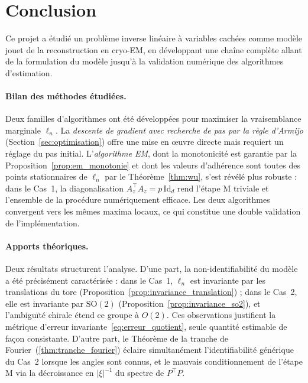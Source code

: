 \documentclass[12pt, a4paper]{article}
\theoremstyle{definition}
\newcommand{\Id}{\mathrm{Id}}
\begin{document}
% 
\newpage
\section*{Conclusion}

Ce projet a étudié un problème inverse linéaire à variables cachées comme modèle
jouet de la reconstruction en cryo-EM, en développant une chaîne complète allant
de la formulation du modèle jusqu'à la validation numérique des algorithmes
d'estimation.

\paragraph{Bilan des méthodes étudiées.}
Deux familles d'algorithmes ont été développées pour maximiser la vraisemblance
marginale $\ell_n$. La \emph{descente de gradient avec recherche de pas par la
règle d'Armijo} (Section~\ref{sec:optimisation}) offre une mise en œuvre directe
mais requiert un réglage du pas initial. L'\emph{algorithme EM}, dont la monotonicité
est garantie par la Proposition~\ref{prop:em_monotonie} et dont les valeurs
d'adhérence sont toutes des points stationnaires de $\ell_n$ par le
Théorème~\ref{thm:wu}, s'est révélé plus robuste : dans le Cas~1, la diagonalisation
$A_z^\top A_z = p\,\Id_d$ rend l'étape M triviale et l'ensemble de la procédure
numériquement efficace. Les deux algorithmes convergent vers les mêmes maxima
locaux, ce qui constitue une double validation de l'implémentation.

\paragraph{Apports théoriques.}
Deux résultats structurent l'analyse. D'une part, la non-identifiabilité du modèle
a été précisément caractérisée : dans le Cas~1, $\ell_n$ est invariante par les
translations du tore (Proposition~\ref{prop:invariance_translation}) ; dans le
Cas~2, elle est invariante par $\mathrm{SO}(2)$ (Proposition~\ref{prop:invariance_so2}),
et l'ambiguïté chirale étend ce groupe à $O(2)$. Ces observations justifient la
métrique d'erreur invariante~\eqref{eq:erreur_quotient}, seule quantité estimable
de façon consistante. D'autre part, le Théorème de la tranche de
Fourier~(\ref{thm:tranche_fourier}) éclaire simultanément l'identifiabilité
générique du Cas~2 lorsque les angles sont connus, et le mauvais conditionnement
de l'étape M via la décroissance en $|\xi|^{-1}$ du spectre de $P^\top P$.
\end{document}

